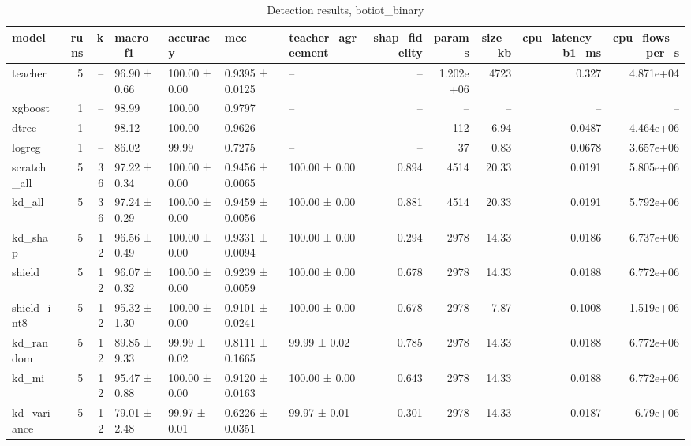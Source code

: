 \begin{table}
\caption{Detection results, botiot_binary}
\begin{tabular}{lrrllllrrrrr}
\toprule
model & runs & k & macro_f1 & accuracy & mcc & teacher_agreement & shap_fidelity & params & size_kb & cpu_latency_b1_ms & cpu_flows_per_s \\
\midrule
teacher & 5 & -- & 96.90 ± 0.66 & 100.00 ± 0.00 & 0.9395 ± 0.0125 & -- & -- & 1.202e+06 & 4723 & 0.327 & 4.871e+04 \\
xgboost & 1 & -- & 98.99 & 100.00 & 0.9797 & -- & -- & -- & -- & -- & -- \\
dtree & 1 & -- & 98.12 & 100.00 & 0.9626 & -- & -- & 112 & 6.94 & 0.0487 & 4.464e+06 \\
logreg & 1 & -- & 86.02 & 99.99 & 0.7275 & -- & -- & 37 & 0.83 & 0.0678 & 3.657e+06 \\
scratch_all & 5 & 36 & 97.22 ± 0.34 & 100.00 ± 0.00 & 0.9456 ± 0.0065 & 100.00 ± 0.00 & 0.894 & 4514 & 20.33 & 0.0191 & 5.805e+06 \\
kd_all & 5 & 36 & 97.24 ± 0.29 & 100.00 ± 0.00 & 0.9459 ± 0.0056 & 100.00 ± 0.00 & 0.881 & 4514 & 20.33 & 0.0191 & 5.792e+06 \\
kd_shap & 5 & 12 & 96.56 ± 0.49 & 100.00 ± 0.00 & 0.9331 ± 0.0094 & 100.00 ± 0.00 & 0.294 & 2978 & 14.33 & 0.0186 & 6.737e+06 \\
shield & 5 & 12 & 96.07 ± 0.32 & 100.00 ± 0.00 & 0.9239 ± 0.0059 & 100.00 ± 0.00 & 0.678 & 2978 & 14.33 & 0.0188 & 6.772e+06 \\
shield_int8 & 5 & 12 & 95.32 ± 1.30 & 100.00 ± 0.00 & 0.9101 ± 0.0241 & 100.00 ± 0.00 & 0.678 & 2978 & 7.87 & 0.1008 & 1.519e+06 \\
kd_random & 5 & 12 & 89.85 ± 9.33 & 99.99 ± 0.02 & 0.8111 ± 0.1665 & 99.99 ± 0.02 & 0.785 & 2978 & 14.33 & 0.0188 & 6.772e+06 \\
kd_mi & 5 & 12 & 95.47 ± 0.88 & 100.00 ± 0.00 & 0.9120 ± 0.0163 & 100.00 ± 0.00 & 0.643 & 2978 & 14.33 & 0.0188 & 6.772e+06 \\
kd_variance & 5 & 12 & 79.01 ± 2.48 & 99.97 ± 0.01 & 0.6226 ± 0.0351 & 99.97 ± 0.01 & -0.301 & 2978 & 14.33 & 0.0187 & 6.79e+06 \\
\bottomrule
\end{tabular}
\end{table}
